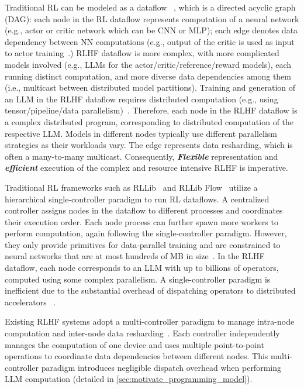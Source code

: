 Traditional RL can be %
modeled as a %
dataflow%
~\cite{liang2021rllib}, which is a directed acyclic graph (DAG): each node in the RL dataflow represents computation of a neural network (e.g., actor or critic network which can be CNN or MLP);
 each edge denotes data dependency between NN computations (e.g., output of the critic is used as input to actor training~\cite{schulman2017proximal}.) %
RLHF dataflow is more complex, with more complicated models involved 
(e.g., LLMs for the actor/critic/reference/reward models),
each running distinct computation,
and more diverse data dependencies among them (i.e., multicast between distributed model partitions). %
Training and generation of an LLM in the RLHF dataflow requires %
distributed computation %
(e.g., using tensor/pipeline/data parallelism)~\cite{shoeybi2019megatron, kwon2023efficient}. %
Therefore, each node in the RLHF dataflow is a complex distributed program, corresponding to distributed computation of the respective LLM. 
Models in different nodes typically use different parallelism strategies as their workloads vary.
The edge represents data resharding, which is often a many-to-many multicast.
Consequently, 
\textit{\textbf{Flexible}} representation and \textit{\textbf{efficient}} execution of the complex and resource intensive RLHF is imperative.


Traditional RL frameworks such as RLLib~\cite{liang2018rllib} and RLLib Flow~\cite{liang2021rllib} utilize a hierarchical single-controller paradigm to run %
RL dataflows. 
A centralized controller %
assigns nodes in the dataflow to different processes and coordinates their execution order. %
Each node process can further spawn more workers to perform computation, again following the single-controller paradigm. 
However, they only provide primitives for data-parallel training and are constrained to neural networks that are at most hundreds of MB in size~\cite{liang2021rllib, liang2018rllib}.
In the RLHF dataflow, %
each node corresponds to %
an LLM with up to billions of operators, computed using some complex parallelism. 
A single-controller paradigm %
is inefficient due to the substantial overhead of dispatching operators to distributed accelerators%
~\cite{barham2022pathways, abadi2016tensorflow}.

Existing RLHF systems adopt a multi-controller paradigm to manage intra-node computation and inter-node data resharding~\cite{hu23openrlhf,NeMoAligner,xiao2023adaptive}.
Each controller independently manages the computation of one device and uses multiple point-to-point operations to coordinate data dependencies between different nodes.
This multi-controller paradigm introduces negligible dispatch overhead when performing LLM computation (detailed in \textsection\ref{sec:motivate_programming_model}).

